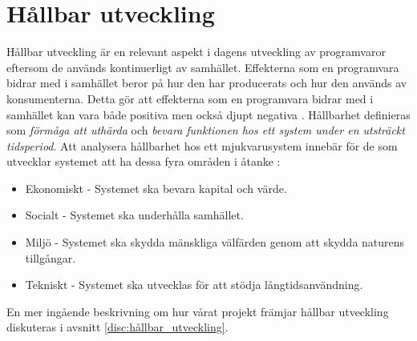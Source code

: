 \section{Hållbar utveckling}
Hållbar utveckling är en relevant aspekt i dagens utveckling av programvaror eftersom de används kontinuerligt av samhället. Effekterna som en programvara bidrar med i samhället beror på hur den har producerats och hur den används av konsumenterna. Detta gör att effekterna som en programvara bidrar med i samhället kan vara både positiva men också djupt negativa \cite{raturi2014developing}. Hållbarhet definieras som \textit{förmåga att uthärda} och \textit{bevara funktionen hos ett system under en utsträckt tidsperiod}. Att analysera hållbarhet hos ett mjukvarusystem innebär för de som utvecklar systemet att ha dessa fyra områden i åtanke \cite{lago2015framing}:

\begin{itemize}
	\item Ekonomiskt -  Systemet ska bevara kapital och värde.
	\item Socialt - Systemet ska underhålla samhället.
	\item Miljö - Systemet ska skydda mänskliga välfärden genom att skydda naturens tillgångar.
	\item Tekniskt - Systemet ska utvecklas för att stödja långtidsanvändning.
\end{itemize}
En mer ingående beskrivning om hur vårat projekt främjar hållbar utveckling diskuteras i avsnitt \ref{disc:hållbar_utveckling}.


